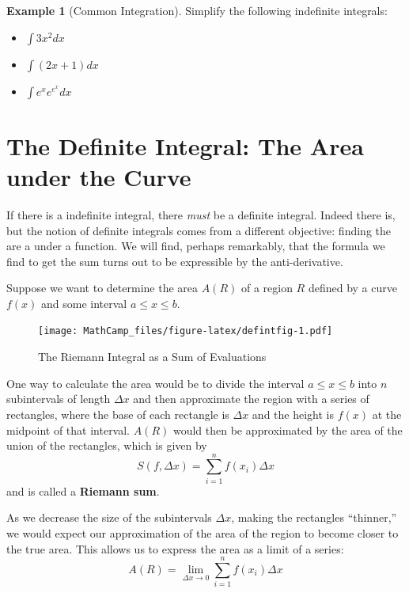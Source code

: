 \documentclass[
]{book}
\providecommand{\tightlist}{%
  \setlength{\itemsep}{0pt}\setlength{\parskip}{0pt}}
\theoremstyle{definition}
\theoremstyle{definition}
\newtheorem{example}{Example}[chapter]
\theoremstyle{definition}
\theoremstyle{definition}
\theoremstyle{remark}
\begin{document}
\begin{example}[Common Integration]
\protect\hypertarget{exm:unnamed-chunk-212}{}{\label{exm:unnamed-chunk-212} {} }Simplify the following indefinite integrals:

\begin{itemize}
\tightlist
\item
  \(\int 3x^2 dx\)
\item
  \(\int (2x+1)dx\)
\item
  \(\int e^x e^{e^x} dx\)
\end{itemize}
\end{example}

\hypertarget{the-definite-integral-the-area-under-the-curve}{%
\section{The Definite Integral: The Area under the Curve}\label{the-definite-integral-the-area-under-the-curve}}

If there is a indefinite integral, there \emph{must} be a definite integral. Indeed there is, but the notion of definite integrals comes from a different objective: finding the are a under a function. We will find, perhaps remarkably, that the formula we find to get the sum turns out to be expressible by the anti-derivative.

Suppose we want to determine the area \(A(R)\) of a region \(R\) defined by a curve \(f(x)\) and some interval \(a\le x \le b\).

\begin{figure}
\centering
\texttt{[image: MathCamp\_files/figure-latex/defintfig-1.pdf]}
\caption{\label{fig:defintfig}The Riemann Integral as a Sum of Evaluations}
\end{figure}

One way to calculate the area would be to divide the interval \(a\le x\le b\) into \(n\) subintervals of length \(\Delta x\) and then approximate the region with a series of rectangles, where the base of each rectangle is \(\Delta x\) and the height is \(f(x)\) at the midpoint of that interval. \(A(R)\) would then be approximated by the area of the union of the rectangles, which is given by \[S(f,\Delta x)=\sum\limits_{i=1}^n f(x_i)\Delta x\] and is called a \textbf{Riemann sum}.

As we decrease the size of the subintervals \(\Delta x\), making the rectangles ``thinner,'' we would expect our approximation of the area of the region to become closer to the true area. This allows us to express the area as a limit of a series:
\[A(R)=\lim\limits_{\Delta x\to 0}\sum\limits_{i=1}^n f(x_i)\Delta x\]
\end{document}
